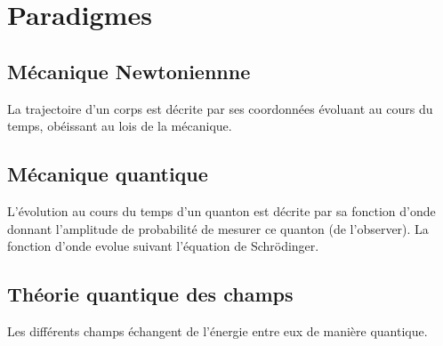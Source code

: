 
\chapter{Paradigmes}

\section{Mécanique Newtoniennne}
%
La trajectoire d'un corps est décrite par ses coordonnées évoluant au cours du temps, obéissant au lois de la mécanique.
%
\section{Mécanique quantique}

L'évolution au cours du temps d'un quanton est décrite par sa fonction d'onde donnant l'amplitude de probabilité de mesurer ce quanton (de l'observer). La fonction d'onde evolue suivant l'équation de Schrödinger.

\section{Théorie quantique des champs}

Les différents champs échangent de l'énergie entre eux de manière quantique.

